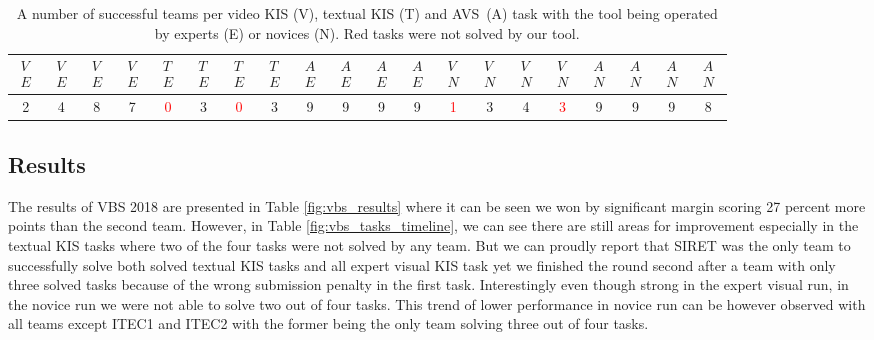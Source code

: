 \begin{table}[b!]
	\centering
	\begin{tabular}{cccc|cccc|cccc|cccc|cccc}
		\toprule
		$\substack{V \\ E}$ & $\substack{V \\ E}$ & $\substack{V \\ E}$ & $\substack{V \\ E}$ & $\substack{T \\ E}$ & $\substack{T \\ E}$ & $\substack{T \\ E}$ & $\substack{T \\ E}$ & $\substack{A \\ E}$ & $\substack{A \\ E}$ & $\substack{A \\ E}$ & $\substack{A \\ E}$ & $\substack{V \\ N}$ & $\substack{V \\ N}$ & $\substack{V \\ N}$ & $\substack{V \\ N}$ & $\substack{A \\ N}$ & $\substack{A \\ N}$ & $\substack{A \\ N}$ & $\substack{A \\ N}$ \\
		\midrule
		2 & 4 & 8 & 7 & \textcolor{red}{0} & 3 & \textcolor{red}{0} & 3 & 9 & 9 & 9 & 9 & \textcolor{red}{1} & 3 & 4 & \textcolor{red}{3} & 9 & 9 & 9 & 8 \\
		\bottomrule
	\end{tabular}
	
	\caption[Number of successful teams per task at VBS 2018]{A number of successful teams per video KIS (V), textual KIS (T) and AVS~(A) task with the tool being operated by experts (E) or novices (N). Red tasks were not solved by our tool.}
	\label{fig:vbs_tasks}
\end{table}

\subsection{Results}
The results of VBS 2018 are presented in Table \ref{fig:vbs_results} where it can be seen we won by significant margin scoring 27 percent more points than the second team. However, in Table \ref{fig:vbs_tasks_timeline}, we can see there are still areas for improvement especially in the textual KIS tasks where two of the four tasks were not solved by any team. But we can proudly report that SIRET was the only team to successfully solve both solved textual KIS tasks and all expert visual KIS task yet we finished the round second after a team with only three solved tasks because of the wrong submission penalty in the first task. Interestingly even though strong in the expert visual run, in the novice run we were not able to solve two out of four tasks. This trend of lower performance in novice run can be however observed with all teams except ITEC1 and ITEC2 with the former being the only team solving three out of four tasks.



